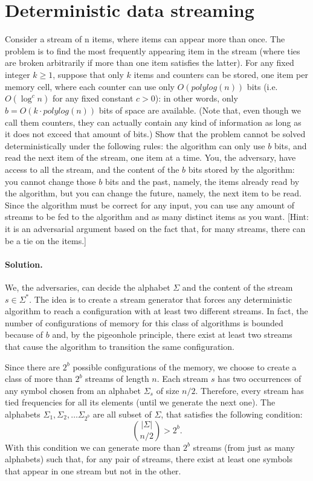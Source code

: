 \section{Deterministic data streaming}

Consider a stream of n items, where items can appear more than once. The problem is to find the most frequently appearing item in the stream (where ties are broken arbitrarily if more than one item satisfies the latter). For any fixed integer $k \geq 1$, suppose that only $k$ items and counters can be stored, one item per memory cell, where each counter can use only $O(polylog(n))$ bits (i.e. $O(\log^c n)$ for any fixed constant $c > 0$): in other words, only $b = O(k\cdot polylog(n))$ bits of space are available. (Note that, even though we call them counters, they can actually contain any kind of information as long as it does not exceed that amount of bits.)
Show that the problem cannot be solved deterministically under the following rules: the algorithm can only use $b$ bits, and read the next item of the stream, one item at a time. You, the adversary, have access to all the stream, and the content of the $b$ bits stored by the algorithm: you cannot change those $b$ bits and the past, namely, the items already read by the algorithm, but you can change the future, namely, the next item to be read. Since the algorithm must be correct for any input, you can use any amount of streams to be fed to the algorithm and as many distinct items as you want. [Hint: it is an adversarial argument based on the fact that, for many streams, there can be a tie on the items.]

\vspace{0.5cm}
\paragraph{Solution.} We, the adversaries, can decide the alphabet $\Sigma$ and the content of the stream $s\in \Sigma^*$. The idea is to create a stream generator that forces any deterministic algorithm to reach a configuration with at least two different streams. In fact, the number of configurations of memory for this class of algorithms is bounded because of $b$ and, by the pigeonhole principle, there exist at least two streams that cause the algorithm to transition the same configuration.

Since there are $2^b$ possible configurations of the memory, we choose to create a class of more than $2^b$ streams of length $n$. Each stream $s$ has two occurrences of any symbol chosen from an alphabet $\Sigma_s$ of size $n/2$. Therefore, every stream has tied frequencies for all its elements (until we generate the next one). The alphabets $\Sigma_1, \Sigma_2, \dots \Sigma_{2^b}$ are all subset of $\Sigma$, that satisfies the following condition:
$${|\Sigma| \choose n/2} > 2^b.$$
With this condition we can generate more than $2^b$ streams (from just as many alphabets) such that, for any pair of streams, there exist at least one symbols that appear in one stream but not in the other.

